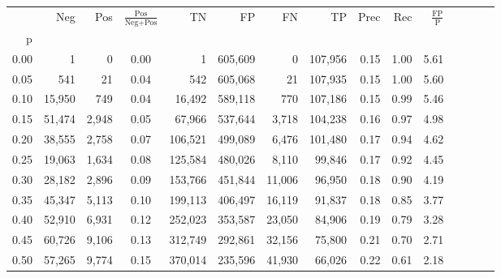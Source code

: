 \begin{tabular}{rrrcrrrrrrrrrrr}
\toprule
{} &     Neg &     Pos & $\frac{\text{Pos}}{\text{Neg}+\text{Pos}}$ &       TN &       FP &       FN &       TP &  Prec &   Rec & $\frac{\text{FP}}{\text{P}}$ \\
p    &         &         &                                            &          &          &          &          &       &       &                              \\
\midrule
0.00 &       1 &       0 &                                       0.00 &        1 &  605,609 &        0 &  107,956 &  0.15 &  1.00 &                         5.61 \\
0.05 &     541 &      21 &                                       0.04 &      542 &  605,068 &       21 &  107,935 &  0.15 &  1.00 &                         5.60 \\
0.10 &  15,950 &     749 &                                       0.04 &   16,492 &  589,118 &      770 &  107,186 &  0.15 &  0.99 &                         5.46 \\
0.15 &  51,474 &   2,948 &                                       0.05 &   67,966 &  537,644 &    3,718 &  104,238 &  0.16 &  0.97 &                         4.98 \\
0.20 &  38,555 &   2,758 &                                       0.07 &  106,521 &  499,089 &    6,476 &  101,480 &  0.17 &  0.94 &                         4.62 \\
0.25 &  19,063 &   1,634 &                                       0.08 &  125,584 &  480,026 &    8,110 &   99,846 &  0.17 &  0.92 &                         4.45 \\
0.30 &  28,182 &   2,896 &                                       0.09 &  153,766 &  451,844 &   11,006 &   96,950 &  0.18 &  0.90 &                         4.19 \\
0.35 &  45,347 &   5,113 &                                       0.10 &  199,113 &  406,497 &   16,119 &   91,837 &  0.18 &  0.85 &                         3.77 \\
0.40 &  52,910 &   6,931 &                                       0.12 &  252,023 &  353,587 &   23,050 &   84,906 &  0.19 &  0.79 &                         3.28 \\
0.45 &  60,726 &   9,106 &                                       0.13 &  312,749 &  292,861 &   32,156 &   75,800 &  0.21 &  0.70 &                         2.71 \\
0.50 &  57,265 &   9,774 &                                       0.15 &  370,014 &  235,596 &   41,930 &   66,026 &  0.22 &  0.61 &                         2.18 \\

\end{tabular}
